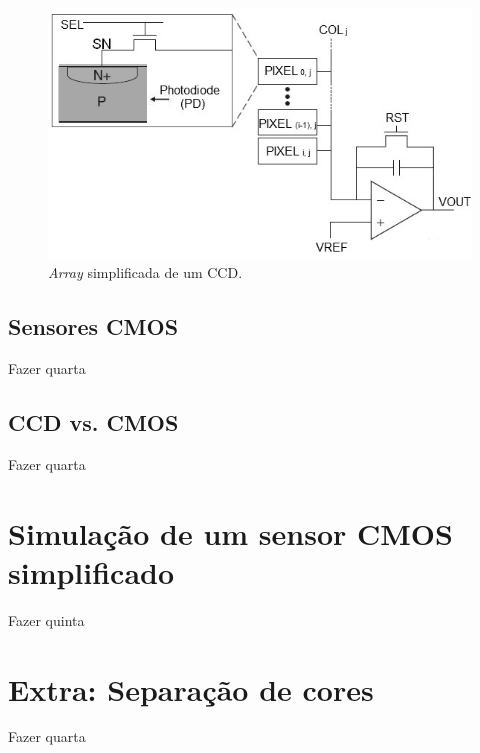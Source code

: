 \documentclass[11pt,a4paper,twocolumn]{article}
\begin{document}
	\begin{figure}[!h]
		\centering
		\includegraphics[scale=0.56]{imagens/passive-pixel.jpg}
		\caption{\textit{Array} simplificada de um CCD.}
	\end{figure}
	
	
	\subsection*{Sensores CMOS}
	Fazer quarta
	\subsection*{CCD vs. CMOS}
	Fazer quarta

	\section*{Simulação de um sensor CMOS simplificado}
	Fazer quinta	
	\section*{Extra: Separação de cores}
	Fazer quarta
	
\end{document}
